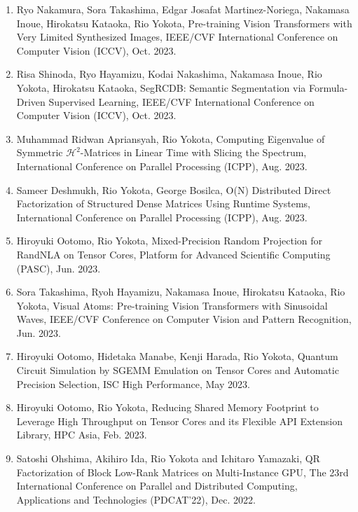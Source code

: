 \documentclass[margin,line]{cv}
\begin{document}
\begin{resume}
\begin{enumerate}
\item Ryo Nakamura, Sora Takashima, Edgar Josafat Martinez-Noriega, Nakamasa Inoue, Hirokatsu Kataoka, Rio Yokota, Pre-training Vision Transformers with Very Limited Synthesized Images, IEEE/CVF International Conference on Computer Vision (ICCV), Oct. 2023.

\item Risa Shinoda, Ryo Hayamizu, Kodai Nakashima, Nakamasa Inoue, Rio Yokota, Hirokatsu Kataoka, SegRCDB: Semantic Segmentation via Formula-Driven Supervised Learning, IEEE/CVF International Conference on Computer Vision (ICCV), Oct. 2023.

\item Muhammad Ridwan Apriansyah, Rio Yokota, Computing Eigenvalue of Symmetric $\mathcal{H}^2$-Matrices in Linear Time with Slicing the Spectrum, International Conference on Parallel Processing (ICPP), Aug. 2023.

\item Sameer Deshmukh, Rio Yokota, George Bosilca, O(N) Distributed Direct Factorization of Structured Dense Matrices Using Runtime Systems, International Conference on Parallel Processing (ICPP), Aug. 2023.

\item Hiroyuki Ootomo, Rio Yokota, Mixed-Precision Random Projection for RandNLA on Tensor Cores, Platform for Advanced Scientific Computing (PASC), Jun. 2023.

\item Sora Takashima, Ryoh Hayamizu, Nakamasa Inoue, Hirokatsu Kataoka, Rio Yokota, Visual Atoms: Pre-training Vision Transformers with Sinusoidal Waves, IEEE/CVF Conference on Computer Vision and Pattern Recognition, Jun. 2023.

\item Hiroyuki Ootomo, Hidetaka Manabe, Kenji Harada, Rio Yokota, Quantum Circuit Simulation by SGEMM Emulation on Tensor Cores and Automatic Precision Selection, ISC High Performance, May 2023.

\item Hiroyuki Ootomo, Rio Yokota, Reducing Shared Memory Footprint to Leverage High Throughput on Tensor Cores and its Flexible API Extension Library, HPC Asia, Feb. 2023.

\item Satoshi Ohshima, Akihiro Ida, Rio Yokota and Ichitaro Yamazaki, QR Factorization of Block Low-Rank Matrices on Multi-Instance GPU, The 23rd International Conference on Parallel and Distributed Computing, Applications and Technologies (PDCAT’22), Dec. 2022.


\end{enumerate}
\end{resume}
\end{document}
